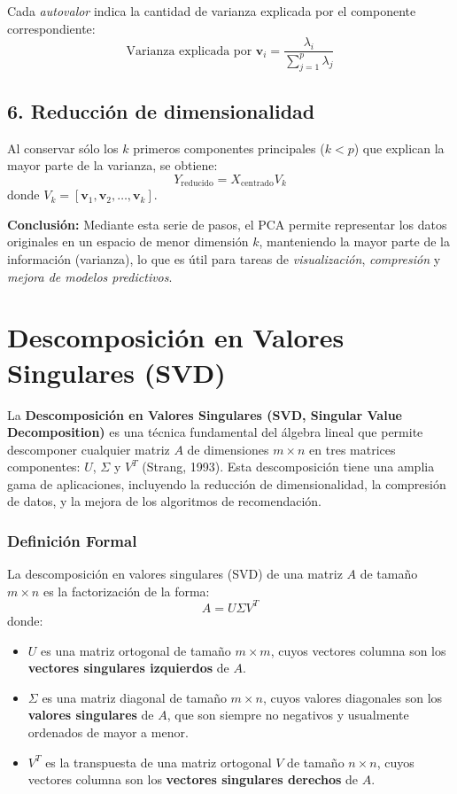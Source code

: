 \documentclass[12pt]{article}
\begin{document}
        Cada \emph{autovalor} indica la cantidad de varianza explicada por el componente correspondiente:
        \[
        \text{Varianza explicada por } \mathbf{v}_i = \frac{\lambda_i}{\sum_{j=1}^p \lambda_j}
        \]
        
        \subsection*{6. Reducción de dimensionalidad}
        
        Al conservar sólo los $ k $ primeros componentes principales ($ k < p $) que explican la mayor parte de la varianza, se obtiene:
        \[
        Y_{\text{reducido}} = X_{\text{centrado}} V_k
        \]
        donde $ V_k = [\mathbf{v}_1, \mathbf{v}_2, \ldots, \mathbf{v}_k] $.
        
        \vspace{1em}
        \noindent
        \textbf{Conclusión:} Mediante esta serie de pasos, el PCA permite representar los datos originales en un espacio de menor dimensión $ k $, manteniendo la mayor parte de la información (varianza), lo que es útil para tareas de \emph{visualización}, \emph{compresión} y \emph{mejora de modelos predictivos}.
        
        \section*{Descomposición en Valores Singulares (SVD)}
        \noindent
        La \textbf{Descomposición en Valores Singulares (SVD, Singular Value Decomposition)} es una técnica fundamental del álgebra lineal que permite descomponer cualquier matriz $A$ de dimensiones $m \times n$ en tres matrices componentes: $U$, $\Sigma$ y $V^T$ (Strang, 1993). Esta descomposición tiene una amplia gama de aplicaciones, incluyendo la reducción de dimensionalidad, la compresión de datos, y la mejora de los algoritmos de recomendación.
        
        \subsubsection*{Definición Formal}
        
        La descomposición en valores singulares (SVD) de una matriz $A$ de tamaño $m \times n$ es la factorización de la forma:
        \[
        A = U \Sigma V^T
        \]
        donde:
        \begin{itemize}
                \item $U$ es una matriz ortogonal de tamaño $m \times m$, cuyos vectores columna son los \textbf{vectores singulares izquierdos} de $A$.
                \item $\Sigma$ es una matriz diagonal de tamaño $m \times n$, cuyos valores diagonales son los \textbf{valores singulares} de $A$, que son siempre no negativos y usualmente ordenados de mayor a menor.
                \item $V^T$ es la transpuesta de una matriz ortogonal $V$ de tamaño $n \times n$, cuyos vectores columna son los \textbf{vectores singulares derechos} de $A$.
        \end{itemize}
        
\end{document}
